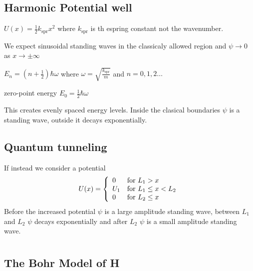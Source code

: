 \documentclass{article}
\newcommand{\hb}{\hbar}
\begin{document}
\subsection*{Harmonic Potential well}

\(U(x)=\frac 12k_{\text{spr}}x^2\) where \(k_{\text{spr}}\) is th espring constant not the wavenumber.

We expect sinusoidal standing waves in the classicaly allowed region and \(\psi\to0\) as \(x\to\pm\infty\)

\(\displaystyle{E_n=\left(n+\frac 12\right)\hb \omega}\) where \(\displaystyle{\omega = \sqrt{\frac{k_{\text{spr}}}{m}}}\) and \(n=0,1,2\dots\)

zero-point energy \(\displaystyle{E_0=\frac 12\hb\omega}\)

This creates evenly spaced energy levels. Inside the clasical boundaries \(\psi\) is a standing wave, outside it decays exponentially.

\subsection*{Quantum tunneling}

If instead we consider a potential
\[U(x) = \left\{
\begin{array}{l l}
0 & \text{for } L_1>x\\
U_1 & \text{for } L_1\le x<L_2\\
0 & \text{for } L_2\le x
\end{array}
\right.\]
Before the increased potential \(\psi\) is a large amplitude standing wave, between \(L_1\) and \(L_2\) \(\psi\) decays exponentially and after \(L_2\) \(\psi\) is a small amplitude standing wave.

\section{}

\subsection*{The Bohr Model of H}
\end{document}
